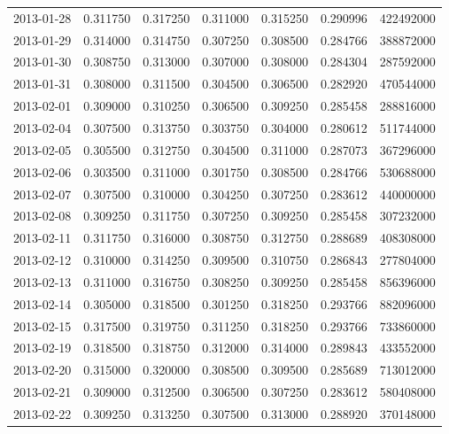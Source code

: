 \begin{tabular}{lrrrrrr}
2013-01-28 &    0.311750 &    0.317250 &    0.311000 &    0.315250 &    0.290996 &   422492000 \\
2013-01-29 &    0.314000 &    0.314750 &    0.307250 &    0.308500 &    0.284766 &   388872000 \\
2013-01-30 &    0.308750 &    0.313000 &    0.307000 &    0.308000 &    0.284304 &   287592000 \\
2013-01-31 &    0.308000 &    0.311500 &    0.304500 &    0.306500 &    0.282920 &   470544000 \\
2013-02-01 &    0.309000 &    0.310250 &    0.306500 &    0.309250 &    0.285458 &   288816000 \\
2013-02-04 &    0.307500 &    0.313750 &    0.303750 &    0.304000 &    0.280612 &   511744000 \\
2013-02-05 &    0.305500 &    0.312750 &    0.304500 &    0.311000 &    0.287073 &   367296000 \\
2013-02-06 &    0.303500 &    0.311000 &    0.301750 &    0.308500 &    0.284766 &   530688000 \\
2013-02-07 &    0.307500 &    0.310000 &    0.304250 &    0.307250 &    0.283612 &   440000000 \\
2013-02-08 &    0.309250 &    0.311750 &    0.307250 &    0.309250 &    0.285458 &   307232000 \\
2013-02-11 &    0.311750 &    0.316000 &    0.308750 &    0.312750 &    0.288689 &   408308000 \\
2013-02-12 &    0.310000 &    0.314250 &    0.309500 &    0.310750 &    0.286843 &   277804000 \\
2013-02-13 &    0.311000 &    0.316750 &    0.308250 &    0.309250 &    0.285458 &   856396000 \\
2013-02-14 &    0.305000 &    0.318500 &    0.301250 &    0.318250 &    0.293766 &   882096000 \\
2013-02-15 &    0.317500 &    0.319750 &    0.311250 &    0.318250 &    0.293766 &   733860000 \\
2013-02-19 &    0.318500 &    0.318750 &    0.312000 &    0.314000 &    0.289843 &   433552000 \\
2013-02-20 &    0.315000 &    0.320000 &    0.308500 &    0.309500 &    0.285689 &   713012000 \\
2013-02-21 &    0.309000 &    0.312500 &    0.306500 &    0.307250 &    0.283612 &   580408000 \\
2013-02-22 &    0.309250 &    0.313250 &    0.307500 &    0.313000 &    0.288920 &   370148000 \\

\end{tabular}
